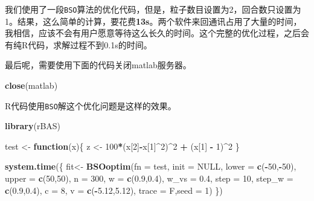 \documentclass[]{ctexbook}
\newenvironment{Shaded}{\begin{snugshade}}{\end{snugshade}}
\newcommand{\KeywordTok}[1]{\textcolor[rgb]{0.13,0.29,0.53}{\textbf{#1}}}
\newcommand{\DataTypeTok}[1]{\textcolor[rgb]{0.13,0.29,0.53}{#1}}
\newcommand{\DecValTok}[1]{\textcolor[rgb]{0.00,0.00,0.81}{#1}}
\newcommand{\FloatTok}[1]{\textcolor[rgb]{0.00,0.00,0.81}{#1}}
\newcommand{\StringTok}[1]{\textcolor[rgb]{0.31,0.60,0.02}{#1}}
\newcommand{\OtherTok}[1]{\textcolor[rgb]{0.56,0.35,0.01}{#1}}
\newcommand{\ControlFlowTok}[1]{\textcolor[rgb]{0.13,0.29,0.53}{\textbf{#1}}}
\newcommand{\OperatorTok}[1]{\textcolor[rgb]{0.81,0.36,0.00}{\textbf{#1}}}
\newcommand{\NormalTok}[1]{#1}
\theoremstyle{definition}
\theoremstyle{definition}
\theoremstyle{definition}
\theoremstyle{remark}
\begin{document}
我们使用了一段\texttt{BSO}算法的优化代码，但是，粒子数目设置为2，回合数只设置为1。结果，这么简单的计算，要花费\textbf{13s}。两个软件来回通讯占用了大量的时间，我相信，应该不会有用户愿意等待这么长久的时间。这个完整的优化过程，之后会有纯R代码，求解过程不到0.1s的时间。

最后呢，需要使用下面的代码关闭matlab服务器。

\begin{Shaded}
\begin{Highlighting}[]
\KeywordTok{close}\NormalTok{(matlab)}
\end{Highlighting}
\end{Shaded}

R代码使用\texttt{BSO}解这个优化问题是这样的效果。

\begin{Shaded}
\begin{Highlighting}[]
\KeywordTok{library}\NormalTok{(rBAS)}

\NormalTok{test <-}\StringTok{ }\ControlFlowTok{function}\NormalTok{(x)\{}
\NormalTok{  z <-}\StringTok{ }\DecValTok{100}\OperatorTok{*}\NormalTok{(x[}\DecValTok{2}\NormalTok{]}\OperatorTok{-}\NormalTok{x[}\DecValTok{1}\NormalTok{]}\OperatorTok{^}\DecValTok{2}\NormalTok{)}\OperatorTok{^}\DecValTok{2} \OperatorTok{+}\StringTok{ }\NormalTok{(x[}\DecValTok{1}\NormalTok{] }\OperatorTok{-}\StringTok{ }\DecValTok{1}\NormalTok{)}\OperatorTok{^}\DecValTok{2}
\NormalTok{\}}

\KeywordTok{system.time}\NormalTok{(\{}
\NormalTok{  fit<-}
\StringTok{    }\KeywordTok{BSOoptim}\NormalTok{(}\DataTypeTok{fn =}\NormalTok{ test,}
             \DataTypeTok{init =} \OtherTok{NULL}\NormalTok{,}
             \DataTypeTok{lower =} \KeywordTok{c}\NormalTok{(}\OperatorTok{-}\DecValTok{50}\NormalTok{,}\OperatorTok{-}\DecValTok{50}\NormalTok{),}
             \DataTypeTok{upper =} \KeywordTok{c}\NormalTok{(}\DecValTok{50}\NormalTok{,}\DecValTok{50}\NormalTok{),}
             \DataTypeTok{n =} \DecValTok{300}\NormalTok{,}
             \DataTypeTok{w =} \KeywordTok{c}\NormalTok{(}\FloatTok{0.9}\NormalTok{,}\FloatTok{0.4}\NormalTok{),}
             \DataTypeTok{w_vs =} \FloatTok{0.4}\NormalTok{, }
             \DataTypeTok{step =} \DecValTok{10}\NormalTok{,}
             \DataTypeTok{step_w =} \KeywordTok{c}\NormalTok{(}\FloatTok{0.9}\NormalTok{,}\FloatTok{0.4}\NormalTok{),}
             \DataTypeTok{c =} \DecValTok{8}\NormalTok{,}
             \DataTypeTok{v =} \KeywordTok{c}\NormalTok{(}\OperatorTok{-}\FloatTok{5.12}\NormalTok{,}\FloatTok{5.12}\NormalTok{),}
             \DataTypeTok{trace =}\NormalTok{ F,}\DataTypeTok{seed =} \DecValTok{1}\NormalTok{)}
\NormalTok{\})}
\end{Highlighting}
\end{Shaded}
\end{document}
